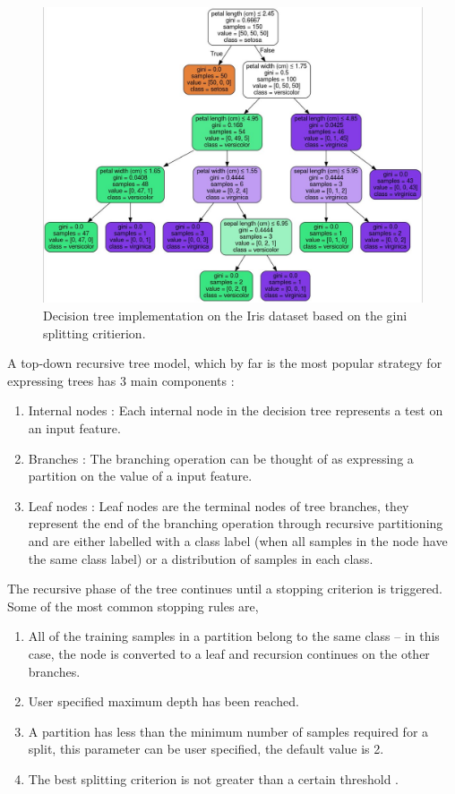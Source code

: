 \documentclass[final,3p,times,twocolumn]{elsarticle}
\begin{document}
\begin{figure}
\includegraphics[scale=0.4]{Images/flow_chart.png}
\caption{Decision tree implementation on the Iris dataset based on the gini splitting critierion.}
\label{flow_tree}
\end{figure}

A top-down recursive tree model, which by far is the most popular strategy for expressing trees has 3 main components :

\begin{enumerate}
\item{Internal nodes : Each internal node in the decision tree represents a test on an input feature.}
\item{Branches : The branching operation can be thought of as expressing a partition on the value of a input feature.}
\item{Leaf nodes : Leaf nodes are the terminal nodes of tree branches, they represent the end of the branching operation through recursive partitioning and are either labelled with a class label (when all samples in the node have the same class label) or a distribution of samples in each class.} 
\end{enumerate}

The recursive phase of the tree continues until a stopping criterion is triggered. Some of the most common stopping rules are, 

\begin{enumerate}
\item{All of the training samples in a partition belong to the same class -- in this case, the node is converted to a leaf and recursion continues on the other branches.}
\item{User specified maximum depth has been reached.}
\item{A partition has less than the minimum number of samples required for a split, this parameter can be user specified, the default value is 2.}
\item{The best splitting criterion is not greater than a certain threshold \cite{IND}.}
\end{enumerate} 
\end{document}
